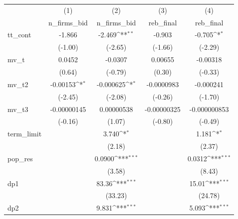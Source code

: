 {
\def\sym#1{\ifmmode^{#1}\else\(^{#1}\)\fi}
\begin{tabular}{l*{4}{c}}
\hline\hline
            &\multicolumn{1}{c}{(1)}&\multicolumn{1}{c}{(2)}&\multicolumn{1}{c}{(3)}&\multicolumn{1}{c}{(4)}\\
            &\multicolumn{1}{c}{n\_firms\_bid}&\multicolumn{1}{c}{n\_firms\_bid}&\multicolumn{1}{c}{reb\_final}&\multicolumn{1}{c}{reb\_final}\\
\hline
tt\_cont     &      -1.866         &      -2.469\sym{**} &      -0.903         &      -0.705\sym{*}  \\
            &     (-1.00)         &     (-2.65)         &     (-1.66)         &     (-2.29)         \\
[1em]
mv\_t        &      0.0452         &     -0.0307         &     0.00655         &    -0.00318         \\
            &      (0.64)         &     (-0.79)         &      (0.30)         &     (-0.33)         \\
[1em]
mv\_t2       &    -0.00153\sym{*}  &   -0.000625\sym{*}  &  -0.0000983         &   -0.000241         \\
            &     (-2.45)         &     (-2.08)         &     (-0.26)         &     (-1.70)         \\
[1em]
mv\_t3       & -0.00000145         &  0.00000538         & -0.00000325         &-0.000000853         \\
            &     (-0.16)         &      (1.07)         &     (-0.80)         &     (-0.49)         \\
[1em]
term\_limit  &                     &       3.740\sym{*}  &                     &       1.181\sym{*}  \\
            &                     &      (2.18)         &                     &      (2.37)         \\
[1em]
pop\_res     &                     &      0.0900\sym{***}&                     &      0.0312\sym{***}\\
            &                     &      (3.58)         &                     &      (8.43)         \\
[1em]
dp1         &                     &       83.36\sym{***}&                     &       15.01\sym{***}\\
            &                     &     (33.23)         &                     &     (24.78)         \\
[1em]
dp2         &                     &       9.831\sym{***}&                     &       5.093\sym{***}\\

\end{tabular}}
